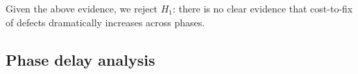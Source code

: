 \documentclass{sig-alternate}
\def\baselinestretch{1}
\begin{document}
%




Given the above evidence, we reject $H_1$: there is no clear evidence that  cost-to-fix of defects dramatically increases across phases.

\subsection{Phase delay analysis} 
 
\end{document}
